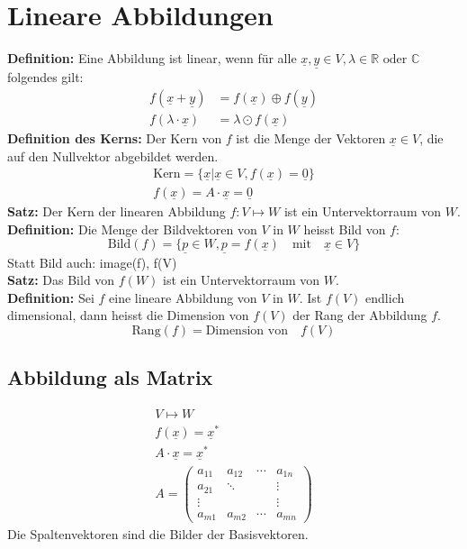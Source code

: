 \section{Lineare Abbildungen}
\textbf{Definition:} Eine Abbildung ist linear, wenn f\"ur alle $\underline{x},
\underline{y} \in V, \lambda \in \mathbb{R} \text{ oder } \mathbb{C}$ folgendes gilt:
\begin{align}
  f(\underline{x} + \underline{y}) &= f(\underline{x}) \oplus f(\underline{y}) \\
  f(\lambda \cdot \underline{x}) &= \lambda \odot f(\underline{x})
\end{align}
\textbf{Definition des Kerns:} Der Kern von $f$ ist die Menge der Vektoren
$\underline{x}\in V$, die auf den Nullvektor abgebildet werden.
\begin{gather}
  \text{Kern} = \{\underline{x} | \underline{x} \in V, f(\underline{x}) = \underline{0}\} \\
  f(\underline{x}) = A\cdot\underline{x} = \underline{0}
\end{gather}
\textbf{Satz:} Der Kern der linearen Abbildung $f : V\longmapsto W$ ist ein Untervektorraum
von $W$. \\
\textbf{Definition:} Die Menge der Bildvektoren von $V$ in $W$ heisst Bild
von $f$:
\begin{equation}
  \text{Bild}(f) = \{\underline{p}\in W, \underline{p} = f(\underline{x}) \quad\text{mit}\quad\underline{x}\in V\}
\end{equation}
Statt Bild auch: image(f), f(V) \\
\textbf{Satz:} Das Bild von $f(W)$ ist ein Untervektorraum von $W$. \\
\textbf{Definition:} Sei $f$ eine lineare Abbildung von $V$ in $W$.
Ist $f(V)$ endlich dimensional, dann heisst die Dimension von $f(V)$ der Rang
der Abbildung $f$.
\begin{equation}
  \text{Rang}(f) = \text{Dimension von}\quad f(V)
\end{equation}

\subsection{Abbildung als Matrix}
\begin{gather}
  V\longmapsto W \\
  f(\underline{x}) = \underline{x}^* \\
  A\cdot\underline{x} = \underline{x}^* \\
  A = \begin{pmatrix}
		a_{11} & a_{12} & \cdots & a_{1n} \\
		a_{21} & \ddots &        & \vdots \\
		\vdots &        &        & \vdots \\
		a_{m1} & a_{m2} & \cdots & a_{mn}
	\end{pmatrix}
\end{gather}
Die Spaltenvektoren sind die Bilder der Basisvektoren. \\

